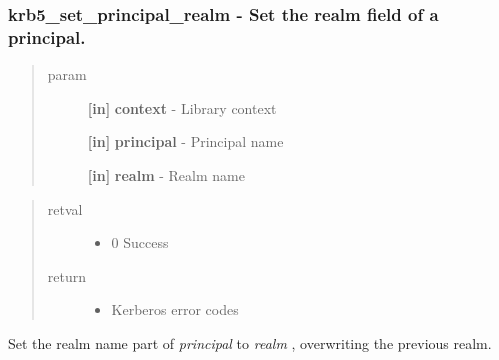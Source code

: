 \documentclass[letterpaper,10pt,english]{sphinxmanual}
\begin{document}
\subsubsection{krb5\_set\_principal\_realm -  Set the realm field of a principal.}
\label{appdev/refs/api/krb5_set_principal_realm::doc}\label{appdev/refs/api/krb5_set_principal_realm:krb5-set-principal-realm-set-the-realm-field-of-a-principal}

\begin{fulllineitems}
\label{appdev/refs/api/krb5_set_principal_realm:krb5_set_principal_realm}
\end{fulllineitems}

\begin{quote}\begin{description}
\item[{param}] \leavevmode
\textbf{{[}in{]}} \textbf{context} - Library context

\textbf{{[}in{]}} \textbf{principal} - Principal name

\textbf{{[}in{]}} \textbf{realm} - Realm name

\end{description}\end{quote}
\begin{quote}\begin{description}
\item[{retval}] \leavevmode\begin{itemize}
\item {} 
0   Success

\end{itemize}

\item[{return}] \leavevmode\begin{itemize}
\item {} 
Kerberos error codes

\end{itemize}

\end{description}\end{quote}

Set the realm name part of \emph{principal} to \emph{realm} , overwriting the previous realm.
\end{document}
